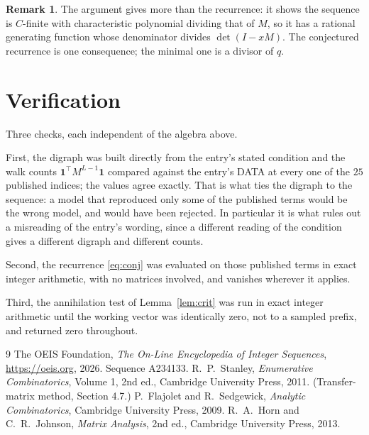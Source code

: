 \documentclass[11pt,a4paper]{article}
\theoremstyle{plain}
\theoremstyle{definition}
\newtheorem{remark}[theorem]{Remark}
\begin{document}
\begin{remark}
The argument gives more than the recurrence: it shows the sequence is $C$-finite with
characteristic polynomial dividing that of $M$, so it has a rational generating function
whose denominator divides $\det(I-xM)$. The conjectured recurrence is one consequence; the
minimal one is a divisor of $q$.
\end{remark}

\section{Verification}

Three checks, each independent of the algebra above.

First, the digraph was built directly from the entry's stated condition and the walk counts
$\mathbf{1}^{\!\top}M^{L-1}\mathbf{1}$ compared against the entry's DATA at
every one of the $25$ published indices; the values agree exactly. That is what ties
the digraph to the sequence: a model that reproduced only some of the published terms would
be the wrong model, and would have been rejected. In particular it is what rules out a
misreading of the entry's wording, since a different reading of the condition gives a
different digraph and different counts.

Second, the recurrence \eqref{eq:conj} was evaluated on those published terms in exact
integer arithmetic, with no matrices involved, and vanishes wherever it applies.

Third, the annihilation test of Lemma~\ref{lem:crit} was run in exact integer arithmetic
until the working vector was identically zero, not to a sampled prefix, and returned zero
throughout.

\begin{thebibliography}{9}
 The OEIS Foundation, \emph{The On-Line Encyclopedia of Integer
Sequences}, \url{https://oeis.org}, 2026. Sequence A234133.
 R.~P.~Stanley, \emph{Enumerative Combinatorics}, Volume 1, 2nd ed.,
Cambridge University Press, 2011. (Transfer-matrix method, Section 4.7.)
 P.~Flajolet and R.~Sedgewick, \emph{Analytic Combinatorics}, Cambridge
University Press, 2009.
 R.~A.~Horn and C.~R.~Johnson, \emph{Matrix Analysis}, 2nd ed., Cambridge
University Press, 2013.
\end{thebibliography}
\end{document}
